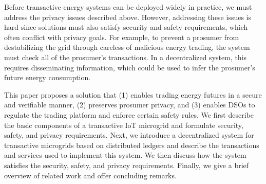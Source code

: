 Before transactive energy systems can be deployed widely in practice,
we must address the privacy issues described above. However, addressing these
issues is hard since solutions must also satisfy security
and safety requirements, which often conflict with privacy goals.  For
example, to prevent a prosumer from destabilizing the grid through
careless of malicious energy trading, the system must check all of the
prosumer's transactions.  In a decentralized system, this requires
disseminating information, which could be used to infer the prosumer's
future energy consumption.

      This
paper proposes a solution that (1) enables trading energy futures in a
secure and verifiable manner, (2) preserves prosumer privacy, and (3)
enables DSOs to regulate the trading platform and enforce certain
safety rules.    We first describe the basic components of a
transactive IoT microgrid and formulate security, safety, and privacy
requirements.  Next, we introduce a decentralized system for
transactive microgrids based on distributed ledgers and describe the
transactions and services used to implement this system.  We then
discuss how the system satisfies the security, safety, and privacy
requirements.  Finally, we give a brief overview of related work and
offer concluding remarks.

